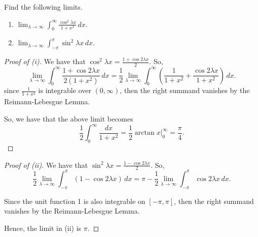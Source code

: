 \documentclass[../hw5]{subfiles}
\begin{document}
\begin{problem}
Find the following limits.
\begin{enumerate}
	\item $\lim_{\lambda \to \infty} \int_{0}^{\infty} \frac{\cos^2{\lambda x} }{1 + x^2} \,dx$.
	\item $\lim_{\lambda \to \infty} \int_{-\pi}^{\pi} \sin^2{\lambda x}\,dx$.
\end{enumerate}
\end{problem}
\begin{proof}[Proof of (i)]
	We have that $\cos^2{\lambda x} = \frac{1 + \cos{2\lambda x} }{2} $.
	So, \[
		\lim_{\lambda \to \infty} \int_{0}^{\infty} \frac{1+\cos{2\lambda x}}{2(1 + x^2)} \,dx
		= \frac{1}{2} \lim_{\lambda \to \infty} \int_{0}^{\infty} \left( \frac{1}{1+x^2} + \frac{\cos{2\lambda x} }{1+x^2} \right)  \,dx
		.\]
	since $\frac{1}{1 + x^2}$ is integrable over $(0,\infty)$, then the right summand vanishes by the Reimann-Lebesgue Lemma.

	So, we have that the above limit becomes \[
		\frac{1}{2}\int_{0}^{\infty} \frac{dx}{1 + x^2} = \frac{1}{2}\arctan x \Big\vert_0^{\infty} = \frac{\pi}{4}
		.\]
\end{proof}
\begin{proof}[Proof of (ii)]
	We have that $\sin^2{\lambda x} = \frac{1-\cos{2\lambda x} }{2} $. So, \[
		\frac{1}{2} \lim_{\lambda \to \infty} \int_{-\pi}^{\pi} (1-\cos{2\lambda x} ) \,dx
		= \pi-\frac{1}{2}\lim_{\lambda \to \infty} \int_{-\pi}^{\pi} \cos{2\lambda x}\,dx
		.\]

	Since the unit function 1 is also integrable on $[-\pi,\pi]$, then the right summand vanishes by the Reimann-Lebesgue Lemma.

	Hence, the limit in (ii) is $\pi$.
\end{proof}
\end{document}
